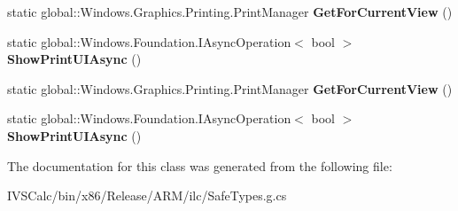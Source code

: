 \begin{DoxyCompactItemize}
static global\+::\+Windows.\+Graphics.\+Printing.\+Print\+Manager {\bfseries Get\+For\+Current\+View} ()
\item 
\mbox{\label{class_windows_1_1_graphics_1_1_printing_1_1_print_manager_a507fbd5a20b33954443017d1fa2ec1b0}} 
static global\+::\+Windows.\+Foundation.\+I\+Async\+Operation$<$ bool $>$ {\bfseries Show\+Print\+U\+I\+Async} ()
\item 
\mbox{\label{class_windows_1_1_graphics_1_1_printing_1_1_print_manager_abfe31189061a172a1ee117f46619d7d5}} 
static global\+::\+Windows.\+Graphics.\+Printing.\+Print\+Manager {\bfseries Get\+For\+Current\+View} ()
\item 
\mbox{\label{class_windows_1_1_graphics_1_1_printing_1_1_print_manager_a507fbd5a20b33954443017d1fa2ec1b0}} 
static global\+::\+Windows.\+Foundation.\+I\+Async\+Operation$<$ bool $>$ {\bfseries Show\+Print\+U\+I\+Async} ()
\end{DoxyCompactItemize}


The documentation for this class was generated from the following file\+:\begin{DoxyCompactItemize}
\item 
I\+V\+S\+Calc/bin/x86/\+Release/\+A\+R\+M/ilc/Safe\+Types.\+g.\+cs\end{DoxyCompactItemize}
